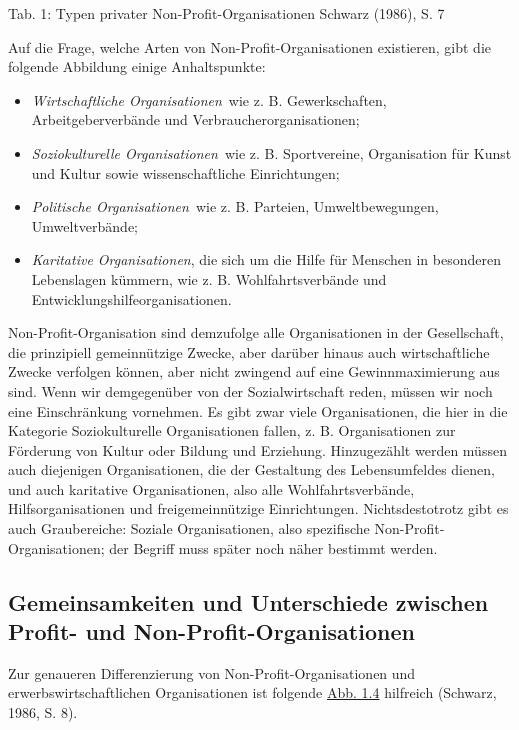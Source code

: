 \documentclass[
  letterpaper,
]{book}
\providecommand{\tightlist}{%
  \setlength{\itemsep}{0pt}\setlength{\parskip}{0pt}}
\begin{document}
Tab. 1: Typen privater Non-Profit-Organisationen
\label{table1}{Schwarz (1986), S. 7}

Auf die Frage, welche Arten von Non-Profit-Organisationen existieren,
gibt die folgende Abbildung einige Anhaltspunkte:

\begin{itemize}
\tightlist
\item
  \emph{Wirtschaftliche Organisationen}~wie z. B. Gewerkschaften,
  Arbeitgeberverbände und Verbraucherorganisationen;
\end{itemize}

\begin{itemize}
\item
  \emph{Soziokulturelle Organisationen}~wie z. B. Sportvereine,
  Organisation für Kunst und Kultur sowie wissenschaftliche
  Einrichtungen;
\item
  \emph{Politische Organisationen}~wie z. B. Parteien, Umweltbewegungen,
  Umweltverbände;
\item
  \emph{Karitative Organisationen}, die sich um die Hilfe für Menschen
  in besonderen Lebenslagen kümmern, wie z. B. Wohlfahrtsverbände und
  Entwicklungshilfeorganisationen.
\end{itemize}

Non-Profit-Organisation sind demzufolge alle Organisationen in der
Gesellschaft, die prinzipiell gemeinnützige Zwecke, aber darüber hinaus
auch wirtschaftliche Zwecke verfolgen können, aber nicht zwingend auf
eine Gewinnmaximierung aus sind. Wenn wir demgegenüber von der
Sozialwirtschaft reden, müssen wir noch eine Einschränkung vornehmen. Es
gibt zwar viele Organisationen, die hier in die Kategorie
Soziokulturelle Organisationen fallen, z. B. Organisationen zur
Förderung von Kultur oder Bildung und Erziehung. Hinzugezählt werden
müssen auch diejenigen Organisationen, die der Gestaltung des
Lebensumfeldes dienen, und auch karitative Organisationen, also alle
Wohlfahrtsverbände, Hilfsorganisationen und freigemeinnützige
Einrichtungen. Nichtsdestotrotz gibt es auch Graubereiche: Soziale
Organisationen, also spezifische Non-Profit-Organisationen; der Begriff
muss später noch näher bestimmt werden.

\subsection{Gemeinsamkeiten und Unterschiede zwischen Profit- und
Non-Profit-Organisationen}\label{vergleichnpo}

Zur genaueren Differenzierung von Non-Profit-Organisationen und
erwerbswirtschaftlichen Organisationen ist folgende
\hyperref[figure14]{Abb. 1.4} hilfreich (Schwarz, 1986, S. 8).
\end{document}
